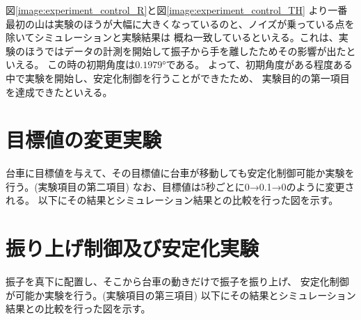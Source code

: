 	図\ref{image:experiment_control_R}と図\ref{image:experiment_control_TH}
	より一番最初の山は実験のほうが大幅に大きくなっているのと、ノイズが乗っている点を除いてシミュレーションと実験結果は
	概ね一致しているといえる。これは、実験のほうではデータの計測を開始して振子から手を離したためその影響が出たといえる。
	この時の初期角度は$0.1979°$である。%
	よって、初期角度がある程度ある中で実験を開始し、安定化制御を行うことができたため、
	実験目的の第一項目を達成できたといえる。
	
	
	
\section{目標値の変更実験}
	台車に目標値を与えて、その目標値に台車が移動しても安定化制御可能か実験を行う。(実験項目の第二項目)
	なお、目標値は5秒ごとに0→0.1→0のように変更される。
	以下にその結果とシミュレーション結果との比較を行った図を示す。

\section{振り上げ制御及び安定化実験}
	振子を真下に配置し、そこから台車の動きだけで振子を振り上げ、
	安定化制御が可能か実験を行う。(実験項目の第三項目)
	以下にその結果とシミュレーション結果との比較を行った図を示す。

